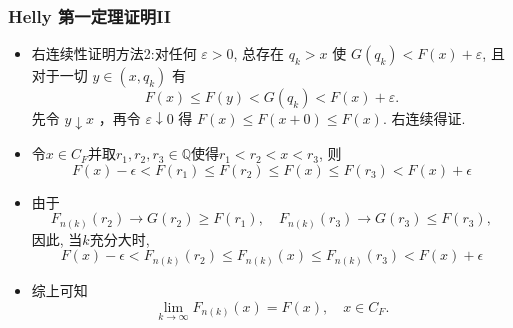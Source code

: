 \begin{frame}
	\frametitle{{\rm Helly} 第一定理证明II}


\begin{itemize}[<+-|alert@+>]

\item 右连续性证明方法2:对任何 $\varepsilon>0$, 总存在 $q_{k}>x$ 使 $G\left(q_{k}\right)<F(x)+\varepsilon$, 且对于一切 $y \in\left(x, q_{k}\right)$ 有
\[
F(x)\leq F(y)<G\left(q_{k}\right)<F(x)+\varepsilon .
\]
先令 $y \downarrow x$ ，再令 $\varepsilon \downarrow 0$ 得 $F(x)\leq F(x+0) \leq F(x)$. 右连续得证.
\item 令$x\in C_F$并取$r_1,r_2,r_3\in\mathbb{Q}$使得$r_{1}<r_{2}<x<r_3$, 则
	\[
	F(x)-\epsilon<F\left(r_{1}\right) \leq F\left(r_{2}\right) \leq F(x) \leq F(r_3)<F(x)+\epsilon
	\]
\item 由于
 \[ F_{n(k)}\left(r_{2}\right) \rightarrow G\left(r_{2}\right) \geq F\left(r_{1}\right), \quad  F_{n(k)}(r_3) \rightarrow G(r_3) \leq F(r_3), \]
 \pause 因此, 当$k$充分大时,
	\[
	F(x)-\epsilon<F_{n(k)}\left(r_{2}\right) \leq F_{n(k)}(x) \leq F_{n(k)}(r_3)<F(x)+\epsilon
	\]
	\item 综上可知
	\[\lim_{k \rightarrow \infty}F_{n(k)}(x) = F(x), \quad x\in C_F.\]
\end{itemize}
\end{frame}



